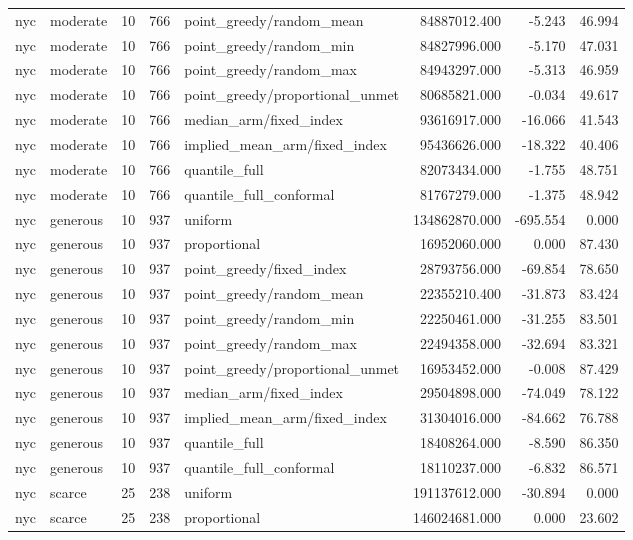 \begin{tabular}{llrrlrrr}
nyc & moderate & 10 & 766 & point\_greedy/random\_mean & 84887012.400 & -5.243 & 46.994 \\
nyc & moderate & 10 & 766 & point\_greedy/random\_min & 84827996.000 & -5.170 & 47.031 \\
nyc & moderate & 10 & 766 & point\_greedy/random\_max & 84943297.000 & -5.313 & 46.959 \\
nyc & moderate & 10 & 766 & point\_greedy/proportional\_unmet & 80685821.000 & -0.034 & 49.617 \\
nyc & moderate & 10 & 766 & median\_arm/fixed\_index & 93616917.000 & -16.066 & 41.543 \\
nyc & moderate & 10 & 766 & implied\_mean\_arm/fixed\_index & 95436626.000 & -18.322 & 40.406 \\
nyc & moderate & 10 & 766 & quantile\_full & 82073434.000 & -1.755 & 48.751 \\
nyc & moderate & 10 & 766 & quantile\_full\_conformal & 81767279.000 & -1.375 & 48.942 \\
nyc & generous & 10 & 937 & uniform & 134862870.000 & -695.554 & 0.000 \\
nyc & generous & 10 & 937 & proportional & 16952060.000 & 0.000 & 87.430 \\
nyc & generous & 10 & 937 & point\_greedy/fixed\_index & 28793756.000 & -69.854 & 78.650 \\
nyc & generous & 10 & 937 & point\_greedy/random\_mean & 22355210.400 & -31.873 & 83.424 \\
nyc & generous & 10 & 937 & point\_greedy/random\_min & 22250461.000 & -31.255 & 83.501 \\
nyc & generous & 10 & 937 & point\_greedy/random\_max & 22494358.000 & -32.694 & 83.321 \\
nyc & generous & 10 & 937 & point\_greedy/proportional\_unmet & 16953452.000 & -0.008 & 87.429 \\
nyc & generous & 10 & 937 & median\_arm/fixed\_index & 29504898.000 & -74.049 & 78.122 \\
nyc & generous & 10 & 937 & implied\_mean\_arm/fixed\_index & 31304016.000 & -84.662 & 76.788 \\
nyc & generous & 10 & 937 & quantile\_full & 18408264.000 & -8.590 & 86.350 \\
nyc & generous & 10 & 937 & quantile\_full\_conformal & 18110237.000 & -6.832 & 86.571 \\
nyc & scarce & 25 & 238 & uniform & 191137612.000 & -30.894 & 0.000 \\
nyc & scarce & 25 & 238 & proportional & 146024681.000 & 0.000 & 23.602 \\

\end{tabular}
